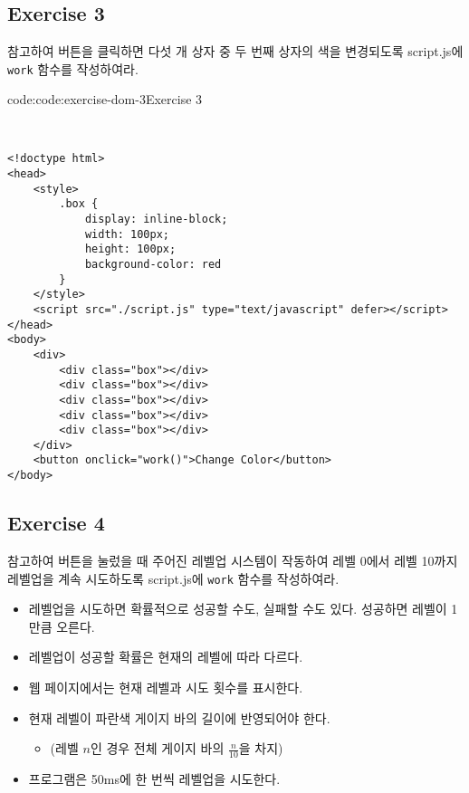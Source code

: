 \subsection*{Exercise 3}

\을 참고하여 버튼을 클릭하면 다섯 개 상자 중 두 번째 상자의 색을 변경되도록 script.js에 \texttt{work} 함수를 작성하여라.

\begin{codeenv}{code:code:exercise-dom-3}{Exercise 3}\begin{verbatim}


<!doctype html>
<head>
    <style>
        .box { 
            display: inline-block; 
            width: 100px; 
            height: 100px; 
            background-color: red 
        }
    </style>
    <script src="./script.js" type="text/javascript" defer></script>
</head>
<body>
    <div>
        <div class="box"></div>
        <div class="box"></div>
        <div class="box"></div>
        <div class="box"></div>
        <div class="box"></div>
    </div>
    <button onclick="work()">Change Color</button>
</body>
\end{verbatim}
\end{codeenv}

\subsection*{Exercise 4}

\을 참고하여 버튼을 눌렀을 때 주어진 레벨업 시스템이 작동하여 레벨 0에서 레벨 10까지 레벨업을 계속 시도하도록 script.js에 \texttt{work} 함수를 작성하여라.

\begin{itemize}
    \item 레벨업을 시도하면 확률적으로 성공할 수도, 실패할 수도 있다. 성공하면 레벨이 1만큼 오른다.
    \item 레벨업이 성공할 확률은 현재의 레벨에 따라 다르다.
    \item 웹 페이지에서는 현재 레벨과 시도 횟수를 표시한다.
    \item 현재 레벨이 파란색 게이지 바의 길이에 반영되어야 한다. 
    \begin{itemize}
        \item (레벨 $n$인 경우 전체 게이지 바의 $\frac n {10}$을 차지)
    \end{itemize}
    \item 프로그램은 50ms에 한 번씩 레벨업을 시도한다.
\end{itemize}

